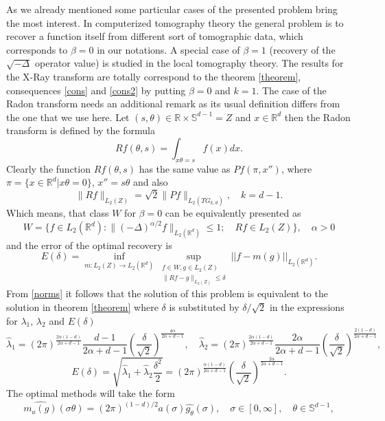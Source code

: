 \documentclass[12pt]{iopart}
\begin{document}
As we already mentioned some particular cases of the presented problem bring the most interest. In computerized tomography theory the general problem is to recover a function itself from different sort of tomographic data, which corresponds to $\beta=0$ in our notations. A special case of $\beta=1$ (recovery of the $\sqrt{-\Delta}$ operator value) is studied in the local tomography theory. The results for the X-Ray transform are totally correspond to the theorem \ref{theorem}, consequences \ref{cons} and \ref{cons2} by putting $\beta=0$ and $k=1$. The case of the Radon transform needs an additional remark as its usual definition differs from the one that we use here. Let $(s,\theta)\in\mathbb R\times\mathbb S^{d-1}=Z$ and $x\in\mathbb R^d$ then the Radon transform is defined by the formula 
$$Rf(\theta,s)=\int_{x\theta=s}f(x)dx.$$
Clearly the function $Rf(\theta,s)$ has the same value as $Pf(\pi,x'')$, where $\pi=\{x\in\mathbb R^d | x\theta=0\}$, $x''=s\theta$ and also
\begin{equation}
\label{norms}
\|Rf\|_{L_2(Z)}=\sqrt{2}\|Pf\|_{L_2(TG_{k,d})},\quad k=d-1.
\end{equation}
Which means, that class $W$ for $\beta=0$ can be equivalently presented as 
$$ W=\{f\in L_2(\mathbb R^d) :
\|(-\Delta)^{\alpha/2}f\|_{L_2(\mathbb R^d)}\leqslant  1;\quad Rf\in L_2(Z) \},\quad\alpha>0$$
and the error of the optimal recovery is
$$
E(\delta)=\inf_{m:L_2(Z)\rightarrow L_2(\mathbb R^d)}\sup_{
  \begin{smallmatrix}
f\in W, g\in L_2(Z)\\ 
\|Rf-g\|_{L_2(Z)}\leqslant \delta
\end{smallmatrix}} ||f-m(g)||_{L_2(\mathbb R^d)}.
$$
From \eqref{norms} it follows that the solution of this problem is equivalent to the solution in theorem \ref{theorem} where $\delta$ is substituted by $\delta/\sqrt{2}$ in the expressions for $\lambda_1$, $\lambda_2$ and $E(\delta)$
$$
 \widehat\lambda_1=(2\pi)^{\frac{2\alpha(1-d)}{2\alpha+d-1}}\frac{d-1}{2\alpha+d-1}\left(\frac{\delta}{\sqrt{2}}\right)^\frac{4\alpha}{2\alpha+d-1},\quad \widehat\lambda_2=(2\pi)^{\frac{2\alpha(1-d)}{2\alpha+d-1}}\frac{2\alpha}{2\alpha+d-1}\left(\frac{\delta}{\sqrt{2}}\right)^\frac{2(1-d)}{2\alpha+d-1}, 
$$
$$
E(\delta)=\sqrt{\widehat\lambda_1+\widehat\lambda_2\frac{\delta^2}{2}}=(2\pi)^{\frac{\alpha(1-d)}{2\alpha+d-1}}\left(\frac{\delta}{\sqrt{2}}\right)^{\frac{2\alpha}{2\alpha+d-1}}.
$$
The optimal methods will take the form 
$$
  \widehat{m_a(g)}(\sigma\theta)=(2\pi)^{(1-d)/2}a(\sigma)\widehat{g_\theta }(\sigma),\quad \sigma\in[0,\infty],\quad \theta\in\mathbb S^{d-1},
$$
\end{document}
